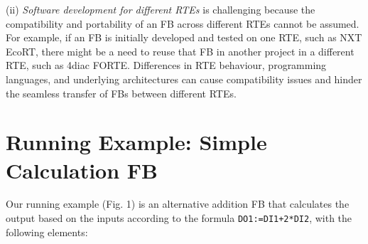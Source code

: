 \begin{bibunit}
(ii) \emph{Software development for different RTEs} is challenging because the compatibility and portability of an FB across different RTEs cannot be assumed. 
For example, if an FB is initially developed and tested on one RTE, such as NXT EcoRT, there might be a need to reuse that FB in another project in a different RTE, such as 4diac FORTE. Differences in RTE behaviour, programming languages, and underlying architectures can cause compatibility issues and hinder the seamless transfer of FBs between different RTEs. 

\section{Running Example: Simple Calculation FB}
Our running example (Fig. 1) is an alternative addition FB that calculates the output based on the inputs according to the formula \texttt{DO1:=DI1+2*DI2}, with the following elements:


\end{bibunit}
